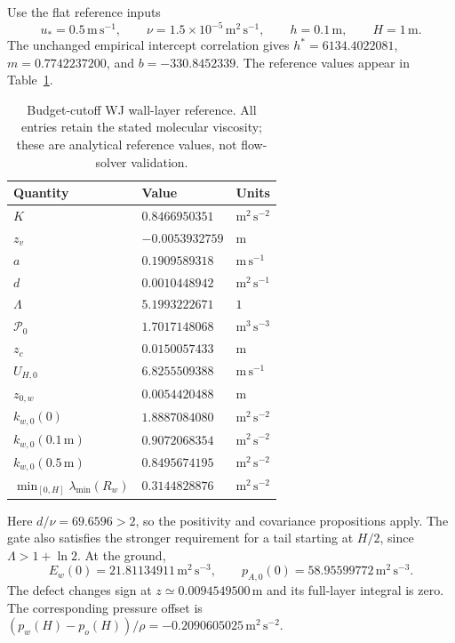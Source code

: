 \documentclass[11pt,a4paper]{article}
\numberwithin{equation}{section}
\begin{document}
Use the flat reference inputs
\begin{equation}
 u_*=0.5\,\mathrm{m\,s^{-1}},\qquad
 \nu=1.5\times10^{-5}\,\mathrm{m^2\,s^{-1}},\qquad
 h=0.1\,\mathrm m,\qquad H=1\,\mathrm m.
 \label{ba:example-inputs}
\end{equation}
The unchanged empirical intercept correlation gives
$h^*=6134.4022081$, $m=0.7742237200$, and $b=-330.8452339$.
The reference values appear in Table~\ref{ba:table-reference}.

\begin{table}[htbp]
\centering\small
\begin{tabular}{@{}lll@{}}
\toprule
Quantity & Value & Units\\
\midrule
$K$ & $0.8466950351$ & $\mathrm{m^2\,s^{-2}}$\\
$z_v$ & $-0.0053932759$ & $\mathrm m$\\
$a$ & $0.1909589318$ & $\mathrm{m\,s^{-1}}$\\
$d$ & $0.0010448942$ & $\mathrm{m^2\,s^{-1}}$\\
$\Lambda$ & $5.1993222671$ & $1$\\
$\mathcal P_0$ & $1.7017148068$ & $\mathrm{m^3\,s^{-3}}$\\
$z_c$ & $0.0150057433$ & $\mathrm m$\\
$U_{H,0}$ & $6.8255509388$ & $\mathrm{m\,s^{-1}}$\\
$z_{0,w}$ & $0.0054420488$ & $\mathrm m$\\
$k_{w,0}(0)$ & $1.8887084080$ & $\mathrm{m^2\,s^{-2}}$\\
$k_{w,0}(0.1\,\mathrm m)$ & $0.9072068354$ & $\mathrm{m^2\,s^{-2}}$\\
$k_{w,0}(0.5\,\mathrm m)$ & $0.8495674195$ & $\mathrm{m^2\,s^{-2}}$\\
$\min_{[0,H]}\lambda_{\min}(R_w)$ & $0.3144828876$ & $\mathrm{m^2\,s^{-2}}$\\
\bottomrule
\end{tabular}
\caption{Budget-cutoff WJ wall-layer reference. All entries retain the
stated molecular viscosity; these are analytical reference values, not
flow-solver validation.}
\label{ba:table-reference}
\end{table}

Here $d/\nu=69.6596>2$, so the positivity and covariance propositions
apply. The gate also satisfies the stronger requirement for a tail
starting at $H/2$, since $\Lambda>1+\ln2$. At the ground,
\begin{equation}
 E_w(0)=21.81134911\,\mathrm{m^2\,s^{-3}},\qquad
 p_{A,0}(0)=58.95599772\,\mathrm{m^2\,s^{-3}}.
 \label{ba:example-local-source}
\end{equation}
The defect changes sign at $z\simeq0.0094549500\,\mathrm m$ and its
full-layer integral is zero. The corresponding pressure offset is
$(p_w(H)-p_o(H))/\rho=-0.2090605025\,\mathrm{m^2\,s^{-2}}$.
\end{document}
